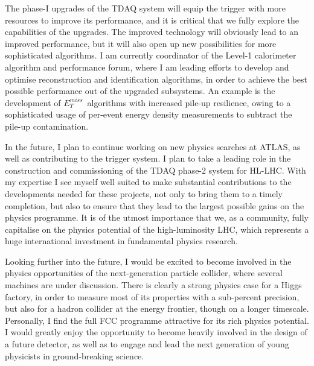 \documentclass[11pt,a4paper,sans]{moderncv}        %
\newcommand{\met}{\ensuremath{E_{{T}}^{{miss}}}}
\begin{document}
The phase-I upgrades of the TDAQ system will equip the trigger with more resources to improve its performance, and it is critical that we fully explore the capabilities of the upgrades. The improved technology will obviously lead to an improved performance, but it will also open up new possibilities for more sophisticated algorithms.
I am currently coordinator of the Level-1 calorimeter algorithm and performance forum, where I am leading efforts to develop and optimise reconstruction and identification algorithms, in order to achieve the best possible performance out of the upgraded subsystems. An example is the development of \met\ algorithms with increased pile-up resilience, owing to a sophisticated usage of per-event energy density measurements to subtract the pile-up contamination. 
\newline

In the future, I plan to continue working on new physics searches at ATLAS, as well as contributing to the trigger system. 
I plan to take a leading role in the construction and commissioning of the TDAQ phase-2 system for HL-LHC.
With my expertise I see myself well suited to make substantial contributions to the developments needed for these projects, not only to bring them to a timely completion, but also to ensure that they lead to the largest possible gains on the physics programme. 
It is of the utmost importance that we, as a community, fully capitalise on the physics potential of the high-luminosity LHC, 
which represents a huge international investment in fundamental physics research.
\newline

Looking further into the future, I would be excited to become involved in the physics opportunities of the next-generation particle collider, where several machines are under discussion. There is clearly a strong physics case for a Higgs factory, in order to measure most of its properties with a sub-percent precision, but also for a hadron collider at the energy frontier, though on a longer timescale. Personally, I find the full FCC programme attractive for its rich physics potential. 
I would greatly enjoy the opportunity to become heavily involved in the design of a future detector, as well as to engage and lead the next generation of young physicists in ground-breaking science.
\newline
\end{document}
